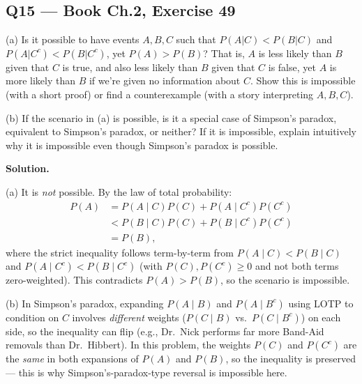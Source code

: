 \documentclass[11pt]{article}
\begin{document}
\subsection*{Q15 --- Book Ch.2, Exercise 49}
\begin{qbox}
(a) Is it possible to have events $A,B,C$ such that $P(A|C) < P(B|C)$ and $P(A|C^c) < P(B|C^c)$, yet $P(A) > P(B)$? That is, $A$ is less likely than $B$ given that $C$ is true, and also less likely than $B$ given that $C$ is false, yet $A$ is more likely than $B$ if we're given no information about $C$. Show this is impossible (with a short proof) or find a counterexample (with a story interpreting $A,B,C$).

(b) If the scenario in (a) is possible, is it a special case of Simpson's paradox, equivalent to Simpson's paradox, or neither? If it is impossible, explain intuitively why it is impossible even though Simpson's paradox is possible.
\end{qbox}
\textbf{Solution.}

(a) It is \emph{not} possible. By the law of total probability:
\begin{align*}
P(A) &= P(A\mid C)P(C) + P(A\mid C^c)P(C^c) \\
&< P(B\mid C)P(C) + P(B\mid C^c)P(C^c) \\
&= P(B),
\end{align*}
where the strict inequality follows term-by-term from $P(A\mid C) < P(B\mid C)$ and $P(A\mid C^c)<P(B\mid C^c)$ (with $P(C), P(C^c) \ge 0$ and not both terms zero-weighted). This contradicts $P(A) > P(B)$, so the scenario is impossible.

(b) In Simpson's paradox, expanding $P(A\mid B)$ and $P(A\mid B^c)$ using LOTP to condition on $C$ involves \emph{different} weights ($P(C\mid B)$ vs.\ $P(C\mid B^c)$) on each side, so the inequality can flip (e.g., Dr.\ Nick performs far more Band-Aid removals than Dr.\ Hibbert). In this problem, the weights $P(C)$ and $P(C^c)$ are the \emph{same} in both expansions of $P(A)$ and $P(B)$, so the inequality is preserved — this is why Simpson's-paradox-type reversal is impossible here.
\end{document}
